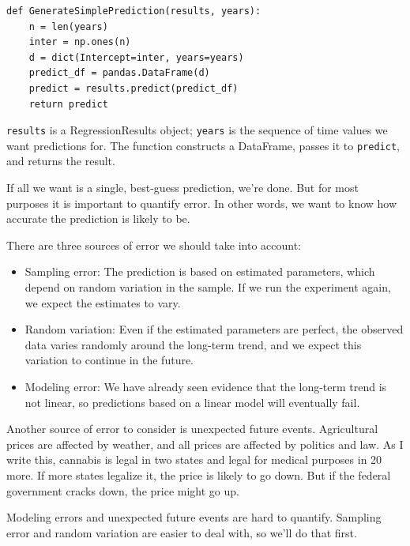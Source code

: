 \documentclass[12pt]{book}
\begin{document}
\begin{verbatim}
def GenerateSimplePrediction(results, years):
    n = len(years)
    inter = np.ones(n)
    d = dict(Intercept=inter, years=years)
    predict_df = pandas.DataFrame(d)
    predict = results.predict(predict_df)
    return predict
\end{verbatim}

{\tt results} is a RegressionResults object; {\tt years} is the
sequence of time values we want predictions for.  The function
constructs a DataFrame, passes it to {\tt predict}, and
returns the result.

If all we want is a single, best-guess prediction, we're done.  But
for most purposes it is important to quantify error.  In other words,
we want to know how accurate the prediction is likely to be.

There are three sources of error we should take into account:

\begin{itemize}

\item Sampling error: The prediction is based on estimated
parameters, which depend on random variation
in the sample.  If we run the experiment again, we expect
the estimates to vary.

\item Random variation:  Even if the estimated parameters are
perfect, the observed data varies randomly around the long-term
trend, and we expect this variation to continue in the future.

\item Modeling error: We have already seen evidence that the long-term
trend is not linear, so predictions based on a linear model will
eventually fail.  

\end{itemize}

Another source of error to consider is unexpected future events.
Agricultural prices are affected by weather, and all prices are
affected by politics and law.  As I write this, cannabis is legal in
two states and legal for medical purposes in 20 more.  If more states
legalize it, the price is likely to go down.  But if
the federal government cracks down, the price might go up.

Modeling errors and unexpected future events are hard to quantify.
Sampling error and random variation are easier to deal with, so we'll
do that first.
\end{document}
